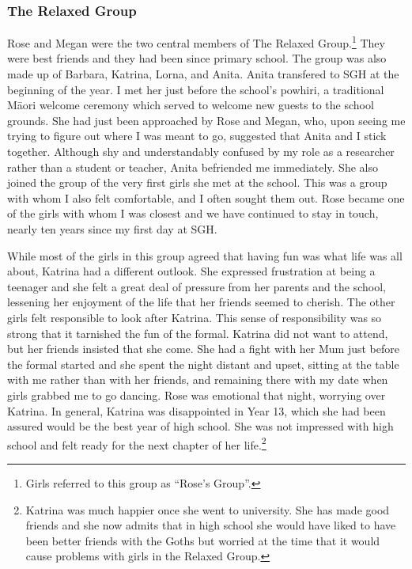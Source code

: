 
\subsubsection{The Relaxed Group}\label{relaxedgroup}

Rose and Megan were the two central members of The Relaxed Group.\footnote{Girls referred to this group as ``Rose's Group''.}  They were best friends and they had been since primary school.  The group was also made up of Barbara, Katrina, Lorna, and Anita.  Anita transfered to SGH at the beginning of the year.  I met her just before the school's powhiri, a traditional M\=aori welcome ceremony which served to welcome new guests to the school grounds.  She had just been approached by Rose and Megan, who, upon seeing me trying to figure out where I was meant to go, suggested that Anita and I stick together.  Although shy and understandably confused by my role as a researcher rather than a student or teacher, Anita befriended me immediately.  She also joined the group of the very first girls she met at the school.  This was a group with whom I also felt comfortable, and I often sought them out.  Rose became one of the girls with whom I was closest and we have continued to stay in touch, nearly ten years since my first day at SGH.

While most of the girls in this group agreed that having fun was what life was all about, Katrina had a different outlook.  She expressed frustration at being a teenager and she felt a great deal of pressure from her parents and the school, lessening her enjoyment of the life that her friends seemed to cherish.  The other girls felt responsible to look after Katrina.  This sense of responsibility was so strong that it tarnished the fun of the formal.  Katrina did not want to attend, but her friends insisted that she come.  She had a fight with her Mum just before the formal started and she spent the night distant and upset, sitting at the table with me rather than with her friends, and remaining there with my date when girls grabbed me to go dancing.  Rose was emotional that night, worrying over Katrina.  In general, Katrina was disappointed in Year 13, which she had been assured would be the best year of high school.  She was not impressed with high school and felt ready for the next chapter of her life.\footnote{Katrina was much happier once she went to university.  She has made good friends and she now admits that in high school she would have liked to have been better friends with the Goths but worried at the time that it would cause problems with girls in the Relaxed Group.}  

